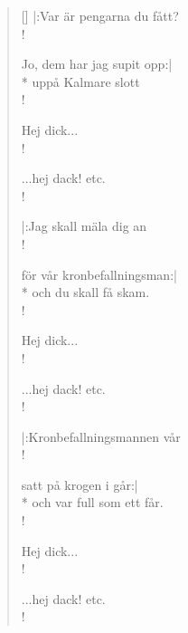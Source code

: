 \begin{verse}[\versewidth]
|:Var är pengarna du fått?\\!

Jo, dem har jag supit opp:|\\*
uppå Kalmare slott\\!

Hej dick...\\!

...hej dack! etc.\\!

|:Jag skall mäla dig an\\!

för vår kronbefallningsman:|\\*
och du skall få skam.\\!

Hej dick...\\!

...hej dack! etc.\\!

|:Kronbefallningsmannen vår\\!

satt på krogen i går:|\\*
och var full som ett får.\\!

Hej dick...\\!

...hej dack! etc.\\!

\end{verse}

